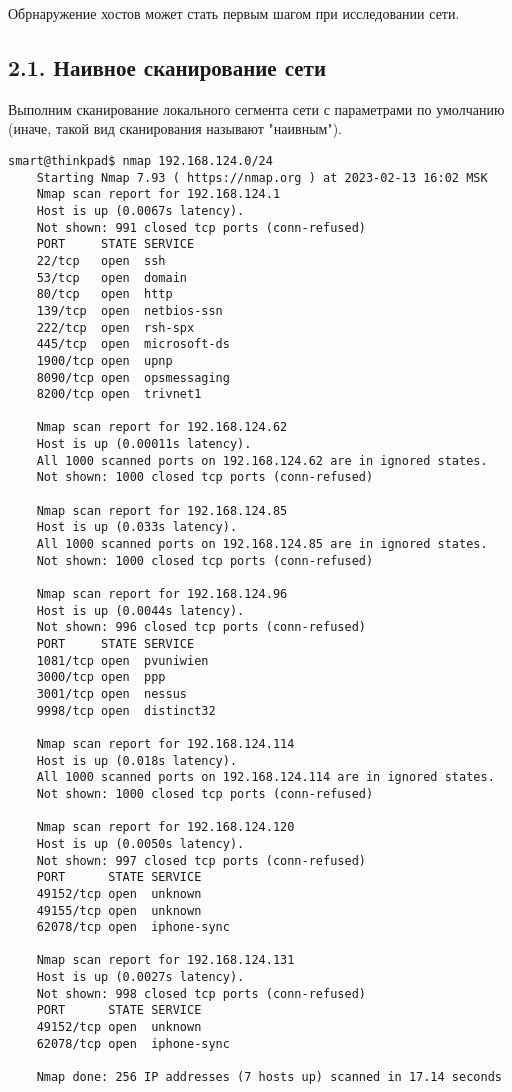 Обрнаружение хостов может стать первым шагом при исследовании сети.

\subsection*{2.1. Наивное сканирование сети}

Выполним сканирование локального сегмента сети с параметрами по умолчанию (иначе, такой вид сканирования называют "наивным").

\begin{Verbatim}[frame=single]
    smart@thinkpad$ nmap 192.168.124.0/24
    Starting Nmap 7.93 ( https://nmap.org ) at 2023-02-13 16:02 MSK
    Nmap scan report for 192.168.124.1
    Host is up (0.0067s latency).
    Not shown: 991 closed tcp ports (conn-refused)
    PORT     STATE SERVICE
    22/tcp   open  ssh
    53/tcp   open  domain
    80/tcp   open  http
    139/tcp  open  netbios-ssn
    222/tcp  open  rsh-spx
    445/tcp  open  microsoft-ds
    1900/tcp open  upnp
    8090/tcp open  opsmessaging
    8200/tcp open  trivnet1

    Nmap scan report for 192.168.124.62
    Host is up (0.00011s latency).
    All 1000 scanned ports on 192.168.124.62 are in ignored states.
    Not shown: 1000 closed tcp ports (conn-refused)

    Nmap scan report for 192.168.124.85
    Host is up (0.033s latency).
    All 1000 scanned ports on 192.168.124.85 are in ignored states.
    Not shown: 1000 closed tcp ports (conn-refused)

    Nmap scan report for 192.168.124.96
    Host is up (0.0044s latency).
    Not shown: 996 closed tcp ports (conn-refused)
    PORT     STATE SERVICE
    1081/tcp open  pvuniwien
    3000/tcp open  ppp
    3001/tcp open  nessus
    9998/tcp open  distinct32

    Nmap scan report for 192.168.124.114
    Host is up (0.018s latency).
    All 1000 scanned ports on 192.168.124.114 are in ignored states.
    Not shown: 1000 closed tcp ports (conn-refused)

    Nmap scan report for 192.168.124.120
    Host is up (0.0050s latency).
    Not shown: 997 closed tcp ports (conn-refused)
    PORT      STATE SERVICE
    49152/tcp open  unknown
    49155/tcp open  unknown
    62078/tcp open  iphone-sync

    Nmap scan report for 192.168.124.131
    Host is up (0.0027s latency).
    Not shown: 998 closed tcp ports (conn-refused)
    PORT      STATE SERVICE
    49152/tcp open  unknown
    62078/tcp open  iphone-sync

    Nmap done: 256 IP addresses (7 hosts up) scanned in 17.14 seconds
\end{Verbatim}


